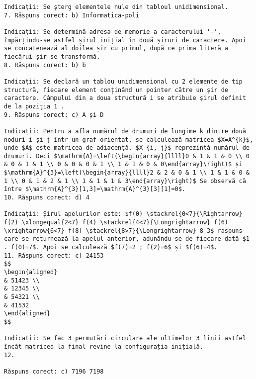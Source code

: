\begin{verbatim}
Indicații: Se șterg elementele nule din tabloul unidimensional.
7. Răspuns corect: b) Informatica-poli

Indicații: Se determină adresa de memorie a caracterului '-', împărțindu-se astfel șirul inițial în două șiruri de caractere. Apoi se concatenează al doilea șir cu primul, după ce prima literă a fiecărui șir se transformă.
8. Răspuns corect: b) b

Indicații: Se declară un tablou unidimensional cu 2 elemente de tip structură, fiecare element conținând un pointer către un șir de caractere. Câmpului din a doua structură i se atribuie șirul definit de la poziția 1 .
9. Răspuns corect: c) A și D

Indicații: Pentru a afla numărul de drumuri de lungime k dintre două noduri i și j într-un graf orientat, se calculează matricea $X=A^{k}$, unde $A$ este matricea de adiacență. $X_{i, j}$ reprezintă numărul de drumuri. Deci $\mathrm{A}=\left(\begin{array}{llll}0 & 1 & 1 & 0 \\ 0 & 0 & 1 & 1 \\ 0 & 0 & 0 & 1 \\ 1 & 1 & 0 & 0\end{array}\right)$ și $\mathrm{A}^{3}=\left(\begin{array}{llll}2 & 2 & 0 & 1 \\ 1 & 1 & 0 & 1 \\ 0 & 1 & 2 & 1 \\ 1 & 1 & 1 & 3\end{array}\right)$ Se observă că între $\mathrm{A}^{3}[1,3]=\mathrm{A}^{3}[3][1]=0$.
10. Răspuns corect: d) 4

Indicații: Șirul apelurilor este: $f(0) \stackrel{0<7}{\Rightarrow} f(2) \xlongequal{2<7} f(4) \stackrel{4<7}{\Longrightarrow} f(6) \xrightarrow{6<7} f(8) \stackrel{8>7}{\Longrightarrow} 8-3$ raspuns care se returnează la apelul anterior, adunându-se de fiecare dată $1 . f(0)=7$. Apoi se calculează $f(7)=2 ; f(2)=6$ și $f(6)=4$.
11. Răspuns corect: c) 24153
$$
\begin{aligned}
& 51423 \\
& 12345 \\
& 54321 \\
& 41532
\end{aligned}
$$

Indicații: Se fac 3 permutări circulare ale ultimelor 3 linii astfel încât matricea la final revine la configurația inițială.
12.

Răspuns corect: c) 7196 7198


\end{verbatim}
